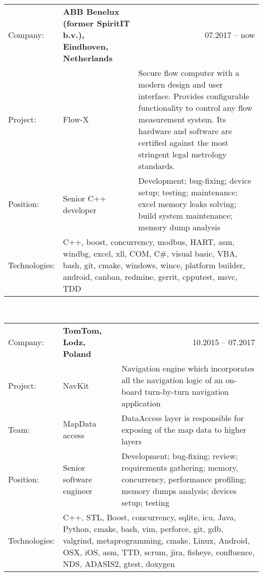 \documentclass{article}
\begin{document}
\noindent\begin{tabular}{@{}lp{45mm}p{115mm}}
  Company: & \textbf{ABB Benelux (former SpiritIT b.v.), Eindhoven, Netherlands} & \multicolumn{1}{r}{07.2017 -- now}\\
  Project: & Flow-X & Secure flow computer with a modern design and user interface. Provides configurable functionality to control any flow measurement system. Its hardware and software are certified against the most stringent legal metrology standards. \\
  Position: & Senior C++ developer& Development; bug-fixing; device setup; testing; maintenance; excel memory leaks solving; build system maintenance; memory dump analysis \\
  Technologies: & \multicolumn{2}{p{160mm}}{C++, boost, concurrency, modbus, HART, asm, windbg, excel, xll, COM, C\#, visual basic, VBA, bash, git, cmake, windows, wince, platform builder, android, canban, redmine, gerrit, cpputest, msvc, TDD}\\
\end{tabular}\\[7mm]
\noindent\begin{tabular}{@{}lp{45mm}p{115mm}}
  Company: & \textbf{TomTom, Lodz, Poland} & \multicolumn{1}{r}{10.2015 -- 07.2017}\\
  Project: & NavKit & Navigation engine which incorporates all the navigation logic of an on-board turn-by-turn navigation application\\
  Team: & MapData access & DataAccess layer is responsible for exposing of the map data to higher layers\\
  Position: & Senior software engineer & Development; bug-fixing; review; requirements gathering; memory, concurrency, performance profiling; memory dumps analysis; devices setup; testing\\
  Technologies: & \multicolumn{2}{p{160mm}}{C++, STL, Boost, concurrency, sqlite, icu, Java, Python, cmake, bash, vim, perforce, git, gdb, valgrind, metaprogramming, cmake, Linux, Android, OSX, iOS, asm,  TTD, scrum, jira, fisheye, confluence, NDS, ADASIS2, gtest, doxygen}\\
\end{tabular}\\[7mm]
\end{document}
